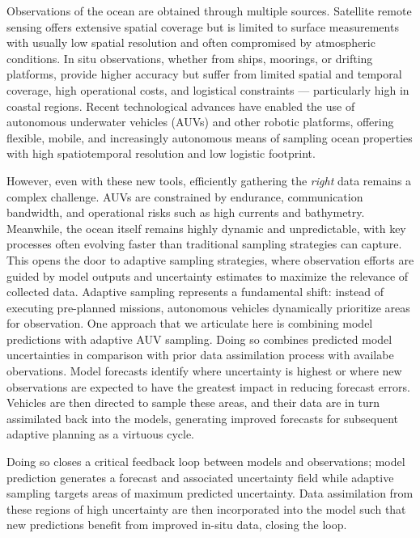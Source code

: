 Observations of the ocean are obtained through multiple sources.
Satellite remote sensing offers extensive spatial coverage but is
limited to surface measurements with usually low spatial resolution and
often compromised by atmospheric conditions. In situ observations,
whether from ships, moorings, or drifting platforms, provide higher
accuracy but suffer from limited spatial and temporal coverage, high
operational costs, and logistical constraints — particularly high in
coastal regions. Recent technological advances have enabled the use of
autonomous underwater vehicles (AUVs) and other robotic platforms,
offering flexible, mobile, and increasingly autonomous means of sampling
ocean properties with high spatiotemporal resolution and low logistic
footprint.

However, even with these new tools, efficiently gathering the
\textit{right} data remains a complex challenge. AUVs are constrained by
endurance, communication bandwidth, and operational risks such as high
currents and bathymetry. Meanwhile, the ocean itself remains highly
dynamic and unpredictable, with key processes often evolving faster than
traditional sampling strategies can capture. This opens the door to
adaptive sampling strategies, where observation efforts are guided by
model outputs and uncertainty estimates to maximize the relevance of
collected data. Adaptive sampling represents a fundamental shift:
instead of executing pre-planned missions, autonomous vehicles
dynamically prioritize areas for observation. One approach that we
articulate here is combining model predictions with adaptive AUV
sampling. Doing so combines predicted model uncertainties in comparison
with prior data assimilation process with availabe obervations. Model
forecasts identify where uncertainty is highest or where new
observations are expected to have the greatest impact in reducing
forecast errors. Vehicles are then directed to sample these areas, and
their data are in turn assimilated back into the models, generating
improved forecasts for subsequent adaptive planning as a virtuous cycle. 

Doing so closes a critical feedback loop between models and
observations; model prediction generates a forecast and associated
uncertainty field while adaptive sampling targets areas of maximum
predicted uncertainty. Data assimilation from these regions of high
uncertainty are then incorporated into the model such that new
predictions benefit from improved in-situ data, closing the loop.

